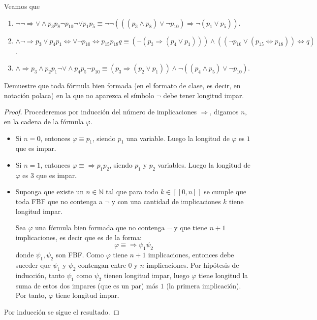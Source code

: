 \documentclass[12pt]{report}
\newcounter{it}
\theoremstyle{largebreak}
\newcommand\natint[1]{\ensuremath{\left[\!\left[ #1\right]\!\right]}}
\begin{document}
    \begin{sol}
        Veamos que
        \begin{enumerate}
            \item $\neg\neg\Rightarrow\lor\land p_3p_8\neg p_{10}\neg\lor p_1p_5\equiv\neg\neg(((p_3\land p_8)\lor\neg p_{10})\Rightarrow\neg( p_1\lor p_5))$.
            \item $\land\neg\Rightarrow p_3\lor p_4p_1\iff\lor\neg p_{10}\iff p_{ 15}p_{18}q\equiv(\neg(p_3\Rightarrow(p_4\lor p_1)))\land((\neg p_{10} \lor (p_{15}\iff p_{18}))\iff q)$.
            \item $\land\Rightarrow p_3\land p_2p_1\neg\lor\land p_4p_5\neg p_{10}\equiv(p_3\Rightarrow(p_2\lor p_1))\land\neg((p_4\land p_5)\lor\neg p_10)$.
        \end{enumerate}
    \end{sol}

    \begin{excer}
        Demuestre que toda fórmula bien formada (en el formato de clase, es decir, en notación polaca) en la que no aparezca el símbolo $\neg$ debe tener longitud impar.
    \end{excer}

    \begin{proof}
        Procederemos por inducción del número de implicaciones $\Rightarrow$, digamos $n$, en la cadena de la fórmula $\varphi$.
        \begin{itemize}
            \item Si $n=0$, entonces $\varphi\equiv p_1$, siendo $p_1$ una variable. Luego la longitud de $\varphi$ es $1$ que es impar.
            \item Si $n=1$, entonces $\varphi\equiv\Rightarrow p_1p_2$, siendo $p_1$ y $p_2$ variables. Luego la longitud de $\varphi$ es $3$ que es impar.
            \item Suponga que existe un $n\in\mathbb{N}$ tal que para todo $k\in\natint{0,n}$ se cumple que toda FBF que no contenga a $\neg$ y con una cantidad de implicaciones $k$ tiene longitud impar.
            
            Sea $\varphi$ una fórmula bien formada que no contenga $\neg$ y que tiene $n+1$ implicaciones, es decir que es de la forma:
            \begin{equation*}
                \varphi \equiv\Rightarrow\psi_1\psi_2
            \end{equation*}
            donde $\psi_1,\psi_2$ son FBF. Como $\varphi$ tiene $n+1$ implicaciones, entonces debe suceder que $\psi_1$ y $\psi_2$ contengan entre $0$ y $n$ implicaciones. Por hipótesis de inducción, tanto $\psi_1$ como $\psi_2$ tienen longitud impar, luego $\varphi$ tiene longitud la suma de estos dos impares (que es un par) más $1$ (la primera implicación). Por tanto, $\varphi$ tiene longitud impar.
        \end{itemize}
        Por inducción se sigue el resultado. 
    \end{proof}
\end{document}
